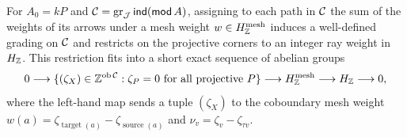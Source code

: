\begin{lemma}
\label{lem:integer-weight-lifting}
For $A_0=kP$ and $\mathcal C=\operatorname{gr}_\mathcal J\operatorname{\mathsf{ind}}(\operatorname{\mathsf{mod}} A)$, assigning to each path in $\mathcal C$ the
sum of the weights of its arrows under a mesh weight $w\in H^{\mathrm{mesh}}_{\mathbb Z}$
induces a well-defined grading on $\mathcal C$ and restricts on the projective
corners to an integer ray weight in $H_{\mathbb Z}$. This restriction fits into a
short exact sequence of abelian groups
\[
 0\longrightarrow
 \{(\zeta_X)\in\mathbb Z^{\operatorname{ob}\mathcal C}:\zeta_P=0
                         \text{ for all projective }P\}
 \longrightarrow H^{\mathrm{mesh}}_{\mathbb Z}\longrightarrow H_{\mathbb Z}
 \longrightarrow0,
\]
where the left-hand map sends a tuple $(\zeta_X)$ to the coboundary mesh
weight $w(a)=\zeta_{\operatorname{target}(a)}-\zeta_{\operatorname{source}(a)}$
and $\nu_v=\zeta_v-\zeta_{\tau v}$.
\end{lemma}
